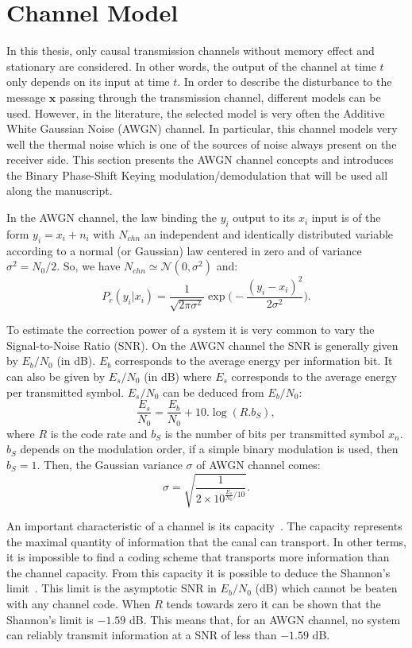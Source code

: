 \section{Channel Model}

In this thesis, only causal transmission channels without memory effect and
stationary are considered. In other words, the output of the channel at time $t$
only depends on its input at time $t$. In order to describe the disturbance to
the message $\bm{x}$ passing through the transmission channel, different
models can be used. However, in the literature, the selected model is very
often the Additive White Gaussian Noise (AWGN) channel. In particular, this
channel models very well the thermal noise which is one of the sources of
noise always present on the receiver side. This section presents the AWGN
channel concepts and introduces the Binary Phase-Shift Keying
modulation/demodulation that will be used all along the manuscript.

In the AWGN channel, the law binding the $y_i$ output to its $x_i$ input is of
the form $y_i = x_i + n_i$ with $N_{chn}$ an independent and identically
distributed variable according to a normal (or Gaussian) law centered in zero
and of variance $\sigma^2 = N_0 / 2$. So, we have $N_{chn} \simeq \mathcal{N}(0,
\sigma^2)$ and:
\begin{equation}
P_r(y_i|x_i) = \frac{1}{\sqrt{2\pi\sigma^2}}\exp{\Big(-\frac{(y_i-x_i)^2}{2\sigma^2}\Big)}.
\end{equation}

To estimate the correction power of a system it is very common to vary the
Signal-to-Noise Ratio (SNR). On the AWGN channel the SNR is generally given by
$E_b/N_0$ (in dB). $E_b$ corresponds to the average energy per information bit.
It can also be given by $E_s/N_0$ (in dB) where $E_s$ corresponds to the average
energy per transmitted symbol. $E_s/N_0$ can be deduced from $E_b/N_0$:
\begin{equation}
\frac{E_s}{N_0} = \frac{E_b}{N_0} + 10.\log{(R.b_S)},
\end{equation}
where $R$ is the code rate and $b_S$ is the number of bits per transmitted
symbol $x_n$. $b_S$ depends on the modulation order, if a simple binary modulation
is used, then $b_S = 1$. Then, the Gaussian variance $\sigma$ of AWGN channel
comes:
\begin{equation}
\sigma = \sqrt{\frac{1}{2 \times 10^{\frac{E_s}{N_0} / 10}}}.
\end{equation}

An important characteristic of a channel is its capacity~\cite{Ryan2009}. The
capacity represents the maximal quantity of information that the canal can
transport. In other terms, it is impossible to find a coding scheme that
transports more information than the channel capacity.
From this capacity it is possible to deduce the Shannon's
limit~\cite{Shannon1948}. This limit is the asymptotic SNR in $E_b/N_0$ (dB)
which cannot be beaten with any channel code. When $R$ tends towards zero it can
be shown that the Shannon's limit is $-1.59$ dB. This means that, for an AWGN
channel, no system can reliably transmit information at a SNR of less than
$-1.59$ dB.


